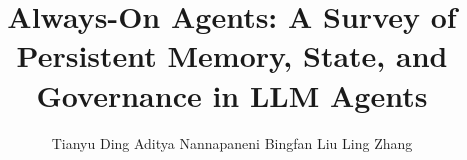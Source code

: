 \documentclass[11pt,letterpaper]{article}
\title{\textbf{Always-On Agents: A Survey of Persistent Memory, State, and Governance in LLM Agents}}
\author{
Tianyu Ding\quad
Aditya Nannapaneni\quad
Bingfan Liu\quad
Ling Zhang
}
\date{}
\begin{document}
\maketitle

\begin{abstract}

\end{abstract}

\tableofcontents
\newpage



\figtimeline


\figheatmap

\figlifecycle
\figinvariants





\figaoep




\FloatBarrier %

\FloatBarrier


\end{document}
